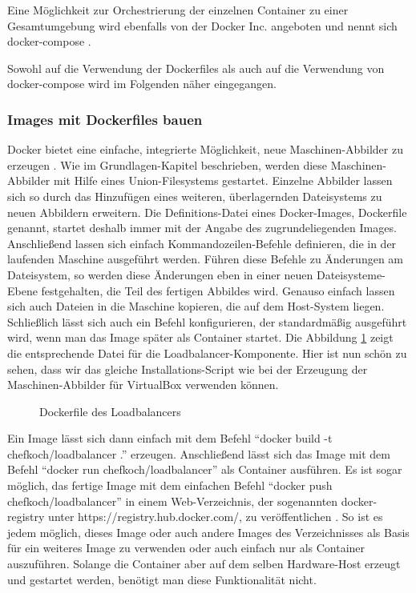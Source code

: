 Eine Möglichkeit zur Orchestrierung der einzelnen Container zu einer Gesamtumgebung wird ebenfalls von der Docker Inc. angeboten und nennt sich docker-compose \citep[Vgl.][]{dockercompose}.

Sowohl auf die Verwendung der Dockerfiles als auch auf die Verwendung von docker-compose wird im Folgenden näher eingegangen.

\subsubsection{Images mit Dockerfiles bauen}

Docker bietet eine einfache, integrierte Möglichkeit, neue Maschinen-Abbilder zu erzeugen \citep[Vgl.][]{docker:003}. Wie im Grundlagen-Kapitel beschrieben, werden diese Maschinen-Abbilder mit Hilfe eines Union-Filesystems gestartet. Einzelne Abbilder lassen sich so durch das Hinzufügen eines weiteren, überlagernden Dateisystems zu neuen Abbildern erweitern. Die Definitions-Datei eines Docker-Images, Dockerfile genannt, startet deshalb immer mit der Angabe des zugrundeliegenden Images. Anschließend lassen sich einfach Kommandozeilen-Befehle definieren, die in der laufenden Maschine ausgeführt werden. Führen diese Befehle zu Änderungen am Dateisystem, so werden diese Änderungen eben in einer neuen Dateisysteme-Ebene festgehalten, die Teil des fertigen Abbildes wird. Genauso einfach lassen sich auch Dateien in die Maschine kopieren, die auf dem Host-System liegen. Schließlich lässt sich auch ein Befehl konfigurieren, der standardmäßig ausgeführt wird, wenn man das Image später als Container startet. Die Abbildung \ref{loadbalancer-dockerfile} zeigt die entsprechende Datei für die Loadbalancer-Komponente. Hier ist nun schön zu sehen, dass wir das gleiche Installations-Script wie bei der Erzeugung der Maschinen-Abbilder für VirtualBox verwenden können.

\begin{figure}[!ht]
  \begin{center}
    \caption{Dockerfile des Loadbalancers}
    \label{loadbalancer-dockerfile}
  \end{center}
\end{figure}

Ein Image lässt sich dann einfach mit dem Befehl "`docker build -t chefkoch/loadbalancer ."' erzeugen. Anschließend lässt sich das Image mit dem Befehl "`docker run chefkoch/loadbalancer"' als Container ausführen. Es ist sogar möglich, das fertige Image mit dem einfachen Befehl "`docker push chefkoch/loadbalancer"' in einem Web-Verzeichnis, der sogenannten docker-registry unter https://registry.hub.docker.com/, zu veröffentlichen \citep[Vgl][]{docker:004}. So ist es jedem möglich, dieses Image oder auch andere Images des Verzeichnisses als Basis für ein weiteres Image zu verwenden oder auch einfach nur als Container auszuführen. Solange die Container aber auf dem selben Hardware-Host erzeugt und gestartet werden, benötigt man diese Funktionalität nicht.

